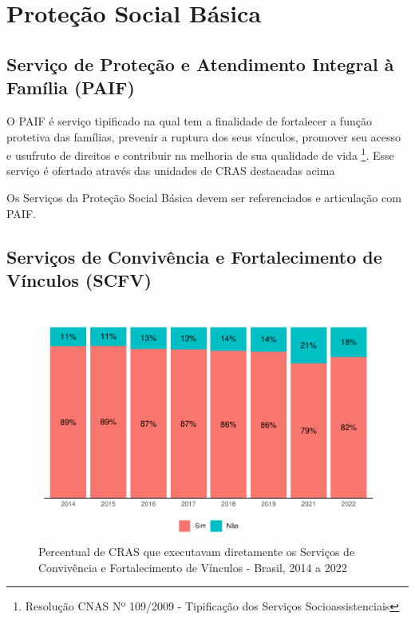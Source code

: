 \documentclass[
  brazilian]{report}
\begin{document}
\hypertarget{proteuxe7uxe3o-social-buxe1sica}{%
\section{Proteção Social Básica}\label{proteuxe7uxe3o-social-buxe1sica}}

\hypertarget{serviuxe7o-de-proteuxe7uxe3o-e-atendimento-integral-uxe0-famuxedlia-paif}{%
\subsection{Serviço de Proteção e Atendimento Integral à Família
(PAIF)}\label{serviuxe7o-de-proteuxe7uxe3o-e-atendimento-integral-uxe0-famuxedlia-paif}}

O PAIF é serviço tipificado na qual tem a finalidade de fortalecer a
função protetiva das famílias, prevenir a ruptura dos seus vínculos,
promover seu acesso e usufruto de direitos e contribuir na melhoria de
sua qualidade de vida
\footnote{Resolução CNAS Nº 109/2009 - Tipificação dos Serviços Socioassistenciais}.
Esse serviço é ofertado através das unidades de CRAS destacadas acima

Os Serviços da Proteção Social Básica devem ser referenciados e
articulação com PAIF.

\hypertarget{serviuxe7os-de-convivuxeancia-e-fortalecimento-de-vuxednculos-scfv}{%
\subsection{Serviços de Convivência e Fortalecimento de Vínculos
(SCFV)}\label{serviuxe7os-de-convivuxeancia-e-fortalecimento-de-vuxednculos-scfv}}

\begin{figure}
\includegraphics{Censo-SUAS-2022_files/figure-latex/CRAS-SCFV-1} \caption[Percentual de CRAS que executavam diretamente os Serviços de Convivência e Fortalecimento de Vínculos - Brasil, 2014 a 2022]{Percentual de CRAS que executavam diretamente os Serviços de Convivência e Fortalecimento de Vínculos - Brasil, 2014 a 2022}\label{fig:CRAS-SCFV}
\end{figure}
\end{document}
